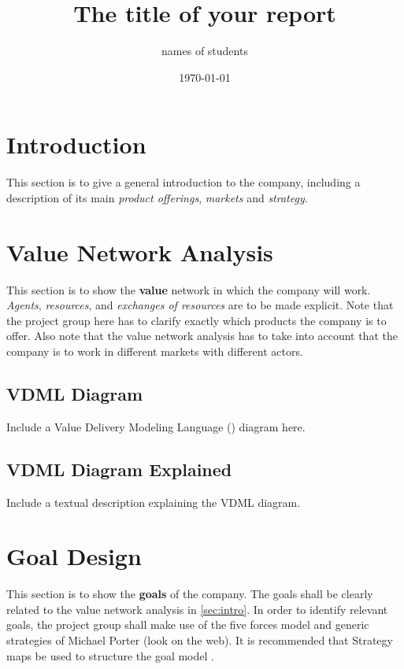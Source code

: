 \documentclass[12pt,a4paper]{article}
\title{The title of your report}
\author{names of students}
\affil{} %
\date{\today}
\begin{document}
\maketitle
\tableofcontents

\section{Introduction} \label{sec:intro}

This section is to give a general introduction to the company, including a description of its main \textit{product offerings},
\textit{markets} and \textit{strategy}.

\section{Value Network Analysis} \label{sec:value}

This section is to show the \textbf{value} network in which the company will work.
\textit{Agents}, \textit{resources}, and \textit{exchanges of resources} are to be made explicit.
Note that the project group here has to clarify exactly which products the company is to offer.
Also note that the value network analysis has to take into account that the company is to work in different markets with different
actors.

\subsection{VDML Diagram}

Include a Value Delivery Modeling Language (\cite{OMG_VDML}) diagram here.

\subsection{VDML Diagram Explained}

Include a textual description explaining the VDML diagram.

\section{Goal Design} \label{sec:goals}

This section is to show the \textbf{goals} of the company.
The goals shall be clearly related to the value network analysis in \autoref{sec:intro}.
In order to identify relevant goals, the project group shall make use of the five forces model \cite{QuickMBA_FiveForces} and generic
strategies of Michael Porter (look on the web).
It is recommended that Strategy maps be used to structure the goal model \cite[ch.~2, pp.~29--52]{Kaplan2004_StrategyMaps}.
\end{document}

